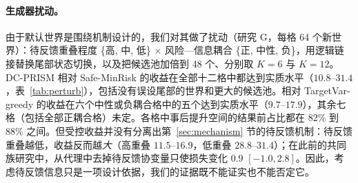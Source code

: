 \documentclass[runningheads]{llncs}
\begin{document}
\paragraph{生成器扰动。}由于默认世界是围绕机制设计的，我们对其做了扰动（研究 G，每格 64 个新世界）：待反馈重叠程度 \{高, 中, 低\} $\times$ 风险—信息耦合 \{正, 中性, 负\}，用逻辑链接替换尾部状态切换，以及把候选池加倍到 48 个、分别取 $K=6$ 与 $K=12$。DC-PRISM 相对 Safe-MinRisk 的收益在全部十二格中都达到实质水平（$10.8$--$31.4$，表~\ref{tab:perturb}），包括没有误设尾部的世界和更大的候选池。相对 TargetVar-greedy 的收益在六个中性或负耦合格中的五个达到实质水平（$9.7$--$17.9$），其余七格（包括全部正耦合格）未定。各格中事后提升空间的结果前占比都在 82\% 到 88\% 之间。但受控收益并没有分离出第~\ref{sec:mechanism} 节的待反馈机制：待反馈重叠越低，收益反而越\emph{大}（高重叠 $11.5$--$16.9$，低重叠 $28.8$--$31.4$）；在此前的共同族研究中，从代理中去掉待反馈协变量只使损失变化 $0.9$ $[-1.0,2.8]$。因此，考虑待反馈信息只是一项设计依据，我们的证据既不能证实也不能否定它。
\end{document}
